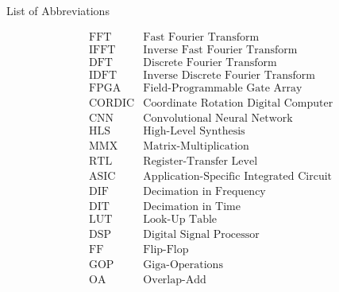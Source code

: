 \documentclass[normalnum]{politex}
\begin{document}
\begin{pretextualsection}{List of Abbreviations}
  \begin{spacing}{\taxaespacoduplo}
    \begin{align*}
      &\textrm{FFT}    &\textrm{Fast Fourier Transform}\\
      &\textrm{IFFT}   &\textrm{Inverse Fast Fourier Transform}\\
      &\textrm{DFT}    &\textrm{Discrete Fourier Transform}\\
      &\textrm{IDFT}   &\textrm{Inverse Discrete Fourier Transform}\\
      &\textrm{FPGA}   &\textrm{Field-Programmable Gate Array}\\
      &\textrm{CORDIC} &\textrm{Coordinate Rotation Digital Computer}\\
      &\textrm{CNN}    &\textrm{Convolutional Neural Network}\\
      &\textrm{HLS}    &\textrm{High-Level Synthesis}\\
      &\textrm{MMX}    &\textrm{Matrix-Multiplication}\\
      &\textrm{RTL}    &\textrm{Register-Transfer Level}\\
      &\textrm{ASIC}   &\textrm{Application-Specific Integrated Circuit}\\
      &\textrm{DIF}    &\textrm{Decimation in Frequency}\\
      &\textrm{DIT}    &\textrm{Decimation in Time}\\
      &\textrm{LUT}    &\textrm{Look-Up Table}\\
      &\textrm{DSP}    &\textrm{Digital Signal Processor}\\
      &\textrm{FF}     &\textrm{Flip-Flop}\\
      &\textrm{GOP}    &\textrm{Giga-Operations}\\
      &\textrm{OA}     &\textrm{Overlap-Add}
    \end{align*}
  \end{spacing}
\end{pretextualsection}

\sumario







\end{document}

